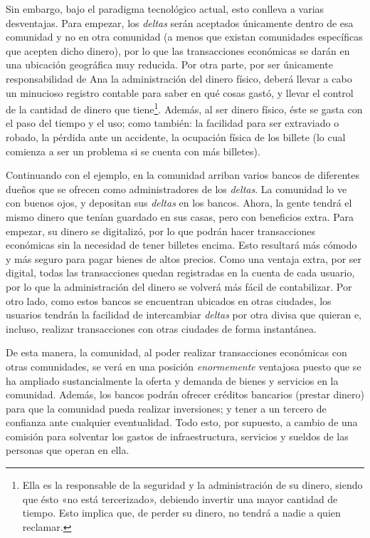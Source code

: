 \documentclass[12pt,a4paper,twoside]{book}
\begin{document}
Sin embargo, bajo el paradigma tecnológico actual, esto conlleva a varias desventajas. Para empezar, los \textit{deltas} serán aceptados únicamente dentro de esa comunidad y no en otra comunidad (a menos que existan comunidades específicas que acepten dicho dinero), por lo que las transacciones económicas se darán en una ubicación geográfica muy reducida. Por otra parte, por ser únicamente responsabilidad de Ana la administración del dinero físico, deberá llevar a cabo un minucioso registro contable para saber en qué cosas gastó, y llevar el control de la cantidad de dinero que tiene\footnote{Ella es la responsable de la seguridad y la administración de su dinero, siendo que ésto «no está tercerizado», debiendo invertir una mayor cantidad de tiempo. Esto implica que, de perder su dinero, no tendrá a nadie a quien reclamar.}. Además, al ser dinero físico, éste se gasta con el paso del tiempo y el uso; como también: la facilidad para ser extraviado o robado, la pérdida ante un accidente, la ocupación física de los billete (lo cual comienza a ser un problema si se cuenta con más billetes).

Continuando con el ejemplo, en la comunidad arriban varios bancos de diferentes dueños que se ofrecen como administradores de los \textit{deltas}. La comunidad lo ve con buenos ojos, y depositan sus \textit{deltas} en los bancos. Ahora, la gente tendrá el mismo dinero que tenían guardado en sus casas, pero con beneficios extra. Para empezar, su dinero se digitalizó, por lo que podrán hacer transacciones económicas sin la necesidad de tener billetes encima. Esto resultará más cómodo y más seguro para pagar bienes de altos precios. Como una ventaja extra, por ser digital, todas las transacciones quedan registradas en la cuenta de cada usuario, por lo que la administración del dinero se volverá más fácil de contabilizar. Por otro lado, como estos bancos se encuentran ubicados en otras ciudades, los usuarios tendrán la facilidad de intercambiar \textit{deltas} por otra divisa que quieran e, incluso, realizar transacciones con otras ciudades de forma instantánea.

De esta manera, la comunidad, al poder realizar transacciones económicas con otras comunidades, se verá en una posición \textit{enormemente} ventajosa puesto que se ha ampliado sustancialmente la oferta y demanda de bienes y servicios en la comunidad. Además, los bancos podrán ofrecer créditos bancarios (prestar dinero) para que la comunidad pueda realizar inversiones; y tener a un tercero de confianza ante cualquier eventualidad. Todo esto, por supuesto, a cambio de una comisión para solventar los gastos de infraestructura, servicios y sueldos de las personas que operan en ella.
\end{document}
